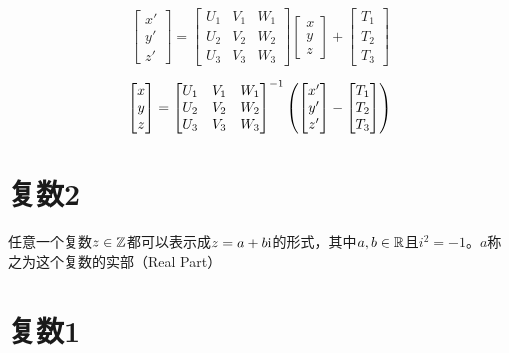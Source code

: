 \[
    \begin{bmatrix}
        x' \\
        y' \\
        z'
    \end{bmatrix}=
    \begin{bmatrix}
        U_1 & V_1 & W_1 \\
        U_2 & V_2 & W_2 \\
        U_3 & V_3 & W_3
    \end{bmatrix}
    \begin{bmatrix}
        x \\
        y \\
        z
    \end{bmatrix} +
    \begin{bmatrix}
        T_1 \\
        T_2 \\
        T_3
    \end{bmatrix}
\]

\[
    \begin{bmatrix}
        x \\
        y \\
        z
    \end{bmatrix}=
    \begin{bmatrix}
        U_1 & V_1 & W_1 \\
        U_2 & V_2 & W_2 \\
        U_3 & V_3 & W_3
    \end{bmatrix}^{-1}\left(
    \begin{bmatrix}
            x' \\
            y' \\
            z'
        \end{bmatrix} -  \begin{bmatrix}
            T_1 \\
            T_2 \\
            T_3
        \end{bmatrix}
    \right)
\]


\section{复数2}

任意一个复数$z\in\mathbb{Z}$都可以表示成$z=a+b\mathrm{i}$的形式，其中$a,b\in\mathbb{R}$且$i^2=-1$。$a$称之为这个复数的实部（Real Part）

\section{复数1}

